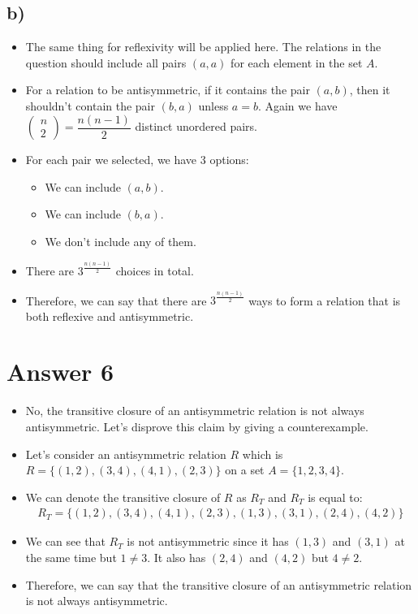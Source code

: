 \documentclass[12pt]{article}
\begin{document}
\subsection*{b)}
\begin{itemize}
 \item The same thing for reflexivity will be applied here. The relations in the question should include all pairs $(a,a)$ for each element in the set $A$.
 \item For a relation to be antisymmetric, if it contains the pair $(a,b)$, then it shouldn't contain the pair $(b,a)$ unless $a = b$. Again we have $\begin{pmatrix} n\\2 \end{pmatrix} = \dfrac{n(n-1)}{2}$ distinct unordered pairs.
 \item For each pair we selected, we have 3 options:
 \begin{itemize}
  \item We can include $(a,b)$.
  \item We can include $(b,a)$.
  \item We don't include any of them.
 \end{itemize}
 \item There are $3^{\frac{n(n-1)}{2}}$ choices in total.
 \item Therefore, we can say that there are $3^{\frac{n(n-1)}{2}}$ ways to form a relation that is both reflexive and antisymmetric.
\end{itemize}

\section*{Answer 6}
\begin{itemize}
 \item No, the transitive closure of an antisymmetric relation is not always antisymmetric. Let's disprove this claim by giving a counterexample.
 \item Let's consider an antisymmetric relation $R$ which is $R = \{(1,2), (3,4), (4,1), (2,3)\}$ on a set $A = \{1,2,3,4\}$.
 \item We can denote the transitive closure of $R$ as $R_T$ and $R_T$ is equal to:
 \begin{equation*}
  \begin{split}
   R_T = \{(1,2),(3,4),(4,1),(2,3),(1,3),(3,1),(2,4),(4,2)\}
  \end{split}
 \end{equation*}
 \item We can see that $R_T$ is not antisymmetric since it has $(1,3)$ and $(3,1)$ at the same time but $1\neq3$. It also has $(2,4)$ and $(4,2)$ but $4\neq2$.
 \item Therefore, we can say that the transitive closure of an antisymmetric relation is not always antisymmetric.
\end{itemize}
\end{document}
